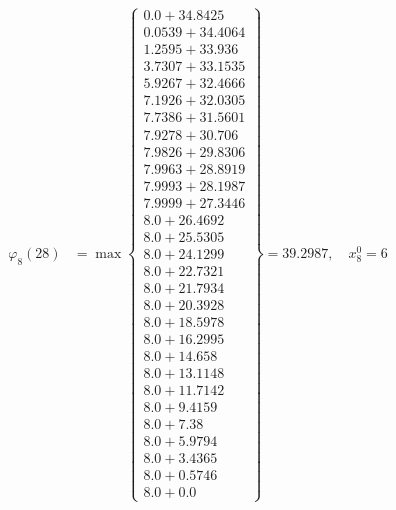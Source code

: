 \documentclass{article}
\begin{document}
\begin{align*}
\varphi_{8}(28) &= \max \left\{ \begin{array}{c}
0.0 + 34.8425 \\
 0.0539 + 34.4064 \\
 1.2595 + 33.936 \\
 3.7307 + 33.1535 \\
 5.9267 + 32.4666 \\
 7.1926 + 32.0305 \\
 7.7386 + 31.5601 \\
 7.9278 + 30.706 \\
 7.9826 + 29.8306 \\
 7.9963 + 28.8919 \\
 7.9993 + 28.1987 \\
 7.9999 + 27.3446 \\
 8.0 + 26.4692 \\
 8.0 + 25.5305 \\
 8.0 + 24.1299 \\
 8.0 + 22.7321 \\
 8.0 + 21.7934 \\
 8.0 + 20.3928 \\
 8.0 + 18.5978 \\
 8.0 + 16.2995 \\
 8.0 + 14.658 \\
 8.0 + 13.1148 \\
 8.0 + 11.7142 \\
 8.0 + 9.4159 \\
 8.0 + 7.38 \\
 8.0 + 5.9794 \\
 8.0 + 3.4365 \\
 8.0 + 0.5746 \\
 8.0 + 0.0
\end{array} \right\}=39.2987, \quad x_{8}^0=6\\
  

\end{align*}
\end{document}
